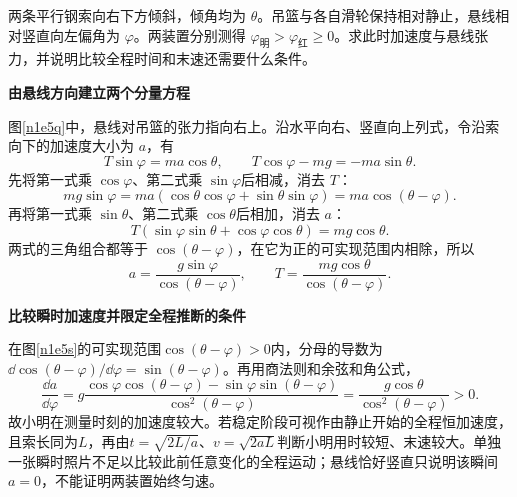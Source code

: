 \begin{question}\begin{example}[由吊篮悬线判断运动]\label{n1e5}
两条平行钢索向右下方倾斜，倾角均为 $\theta$。吊篮与各自滑轮保持相对静止，悬线相对竖直向左偏角为 $\varphi$。两装置分别测得 $\varphi_{\text{明}}>\varphi_{\text{红}}\ge0$。求此时加速度与悬线张力，并说明比较全程时间和末速还需要什么条件。
\end{example}\end{question}
\begin{solution}\textbf{由悬线方向建立两个分量方程}\par\nobreak
图\ref{n1e5q}中，悬线对吊篮的张力指向右上。沿水平向右、竖直向上列式，令沿索向下的加速度大小为 $a$，有
\[
 T\sin\varphi=ma\cos\theta,\qquad
 T\cos\varphi-mg=-ma\sin\theta.
\]
先将第一式乘 $\cos\varphi$、第二式乘 $\sin\varphi$后相减，消去 $T$：
\[
 mg\sin\varphi
 =ma(\cos\theta\cos\varphi+\sin\theta\sin\varphi)
 =ma\cos(\theta-\varphi).
\]
再将第一式乘 $\sin\theta$、第二式乘 $\cos\theta$后相加，消去 $a$：
\[
 T(\sin\varphi\sin\theta+\cos\varphi\cos\theta)=mg\cos\theta.
\]
两式的三角组合都等于 $\cos(\theta-\varphi)$，在它为正的可实现范围内相除，所以
\[
 a=\frac{g\sin\varphi}{\cos(\theta-\varphi)},\qquad
 T=\frac{mg\cos\theta}{\cos(\theta-\varphi)}.
\]



\par\medskip{}\noindent\textbf{比较瞬时加速度并限定全程推断的条件}\par\nobreak
在图\ref{n1e5s}的可实现范围$\cos(\theta-\varphi)>0$内，分母的导数为$\dd\cos(\theta-\varphi)/\dd\varphi=\sin(\theta-\varphi)$。再用商法则和余弦和角公式，
\[
\frac{\dd a}{\dd\varphi}
=g\frac{\cos\varphi\cos(\theta-\varphi)-\sin\varphi\sin(\theta-\varphi)}{\cos^2(\theta-\varphi)}
=\frac{g\cos\theta}{\cos^2(\theta-\varphi)}>0.
\]
故小明在测量时刻的加速度较大。若稳定阶段可视作由静止开始的全程恒加速度，且索长同为$L$，再由$t=\sqrt{2L/a}$、$v=\sqrt{2aL}$判断小明用时较短、末速较大。单独一张瞬时照片不足以比较此前任意变化的全程运动；悬线恰好竖直只说明该瞬间$a=0$，不能证明两装置始终匀速。
\end{solution}

